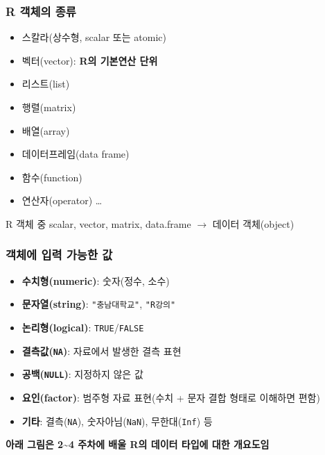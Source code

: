\documentclass[
  11pt,
]{krantz}
\providecommand{\tightlist}{%
  \setlength{\itemsep}{0pt}\setlength{\parskip}{0pt}}
\begin{document}
\hypertarget{ch2-object-type}{%
\subsubsection*{R 객체의 종류}\label{ch2-object-type}}


\begin{itemize}
\tightlist
\item
  스칼라(상수형, scalar 또는 atomic)
\item
  벡터(vector): \textbf{R의 기본연산 단위}
\item
  리스트(list)
\item
  행렬(matrix)
\item
  배열(array)
\item
  데이터프레임(data frame)
\item
  함수(function)
\item
  연산자(operator) \ldots{}
\end{itemize}

R 객체 중 scalar, vector, matrix, data.frame \(\rightarrow\) 데이터 객체(object)

\hypertarget{object-value}{%
\subsubsection*{객체에 입력 가능한 값}\label{object-value}}


\begin{itemize}
\item
  \textbf{수치형(numeric)}: 숫자(정수, 소수)
\item
  \textbf{문자열(string)}: \texttt{"충남대학교"}, \texttt{"R강의"}
\item
  \textbf{논리형(logical)}: \texttt{TRUE}/\texttt{FALSE}
\item
  \textbf{결측값(\texttt{NA})}: 자료에서 발생한 결측 표현
\item
  \textbf{공백(\texttt{NULL})}: 지정하지 않은 값
\item
  \textbf{요인(factor)}: 범주형 자료 표현(수치 + 문자 결합 형태로 이해하면 편함)
\item
  \textbf{기타}: 결측(\texttt{NA}), 숫자아님(\texttt{NaN}), 무한대(\texttt{Inf}) 등
\end{itemize}

\textbf{아래 그림은 2\textasciitilde4 주차에 배울 R의 데이터 타입에 대한 개요도임}

\footnotesize
\end{document}
